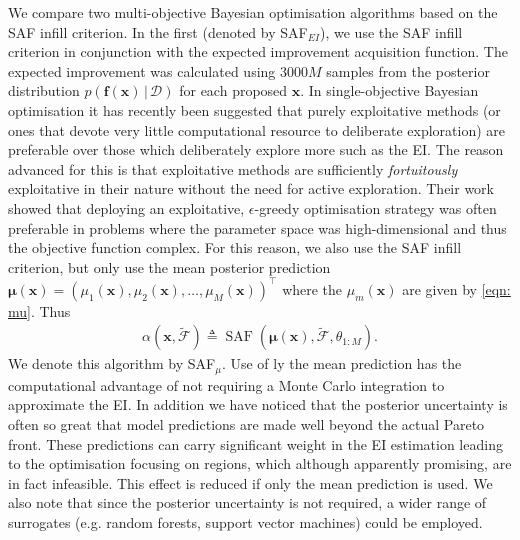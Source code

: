 \documentclass[conference]{IEEEtran}
\makeatletter
\newcommand{\nobj}{M}
\newcommand{\defn}{\triangleq}
\DeclareMathOperator*{\saf}{SAF}
\newcommand\safmu{SAF$_{\mu}$\xspace}
\newcommand\safei{SAF$_{EI}$\xspace}
\newcommand\ei{EI\xspace}
\newcommand\Fapprox{\tilde{\mathcal{F}}}
\newcommand{\trp}{^\top}
\newcommand{\given}{\,|\,}
\newcommand{\bx}{\mathbf{x}}
\newcommand{\bff}{\mathbf{f}}
\newcommand{\bmu}{\boldsymbol{\mu}}
\newcommand{\data}{\mathcal{D}}
\newcommand*{\eg}{e.g.\@\xspace}
\makeatother
\begin{document}
We compare two multi-objective Bayesian optimisation algorithms based on the SAF infill criterion.  In the first (denoted by \safei), we use the SAF infill criterion in conjunction with the expected improvement acquisition function. The expected improvement was calculated using $3000M$ samples from the posterior distribution $p(\bff(\bx) \given \data)$ for each proposed $\bx$.
In single-objective Bayesian optimisation it has recently been suggested that purely exploitative  methods (or ones that devote very little computational resource to deliberate exploration) are preferable over those which deliberately explore more such as the \ei \cite{death2019greed}. The reason advanced for this is that exploitative methods are sufficiently \textit{fortuitously} exploitative in their nature without the need for active exploration. Their work showed that deploying an exploitative, $\epsilon$-greedy optimisation strategy was often preferable in problems where the parameter space was high-dimensional and thus the objective function complex.  For this reason, we also use the SAF infill criterion, but only use the mean posterior prediction $\bmu(\bx) = (\mu_1(\bx), \mu_2(\bx),\ldots, \mu_\nobj(\bx))\trp$ where the $\mu_m(\bx)$ are given by \eqref{eqn: mu}.  Thus
\begin{align}
    \alpha(\bx, \Fapprox) \defn \saf(\bmu(\bx), \Fapprox, \theta_{1:M}).
\end{align}  
We denote this algorithm by \safmu.   Use of ly the mean prediction has the computational advantage of not requiring a Monte Carlo integration to approximate the \ei. In addition we have noticed that the posterior uncertainty is often so great that model predictions are made well beyond the actual Pareto front. These predictions can carry significant weight in the \ei estimation leading to the optimisation focusing on regions, which although apparently promising, are in fact infeasible.  This effect is reduced if only the mean prediction is used.  We also note that since the posterior uncertainty is not required, a wider range of surrogates (\eg random forests, support vector machines) could be employed. 

\end{document}
